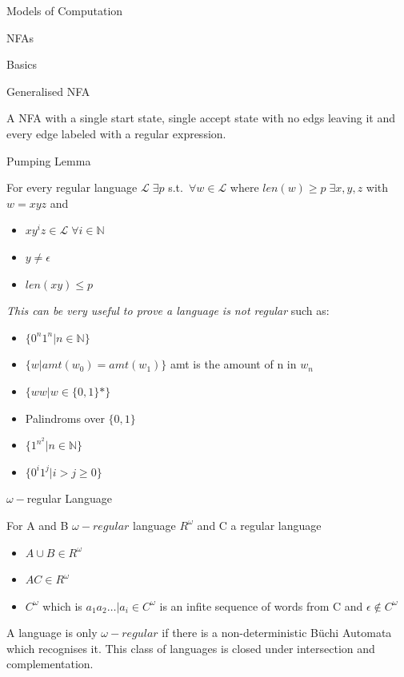 \documentclass[12pt, letterpaper]{article}
\begin{document}
\begin{section}{Models of Computation}
\begin{subsection}{NFAs}
\begin{subsubsection}{Basics}
    \end{subsubsection}

    \begin{subsubsection}{Generalised NFA}

      A NFA with a single start state, single accept state with no edgs leaving
      it and every edge labeled with a regular expression.

    \end{subsubsection}
  
  \end{subsection}

  \begin{subsection}{Pumping Lemma}

    For every regular language \(\mathscr{L} \; \exists p\) s.t.\
    \(\forall w \in \mathscr{L}\) where \(len(w) \geq p \;
    \exists x, y, z\) with \(w = xyz\) and
    \begin{itemize}
      \item \(xy^{i}z \in \mathscr{L} \; \forall i \in \mathbb{N}\)
      \item \(y \neq \epsilon\)
      \item \(len(xy) \leq p\)
    \end{itemize}
    \emph{This can be very useful to prove a language is not regular} such as:
    \begin{itemize}
      \item \(\{ 0^{n}1^{n} | n \in \mathbb{N} \}\)
      \item \(\{ w | amt(w_{0}) = amt(w_{1})\}\) amt is the amount of n in \(w_{n}\)
      \item \(\{ ww | w\in \{ 0, 1 \}* \}\)
      \item Palindroms over \(\{ 0, 1 \}\)
      \item \(\{ 1^{n^{2}} | n \in \mathbb{N} \}\)
      \item \(\{ 0^{i} 1^{j} | i > j \geq 0 \}\)
    \end{itemize}

  \end{subsection}

  \begin{subsection}{\(\omega-\)regular Language}

    For A and B \(\omega-regular\) language \(R^{\omega}\) and C a regular
    language
    \begin{itemize}
      \item \(A \cup B \in R^{\omega}\)
      \item \(AC \in R^{\omega}\)
      \item \(C^{\omega}\) which is \(a_{1}a_{2} \dots | a_{i} \in C^{\omega}\)
      is an infite sequence of words from C and \(\epsilon \notin C^{\omega}\)
    \end{itemize}
    A language is only \(\omega-regular\) if there is a non-deterministic
    B\"uchi Automata which recognises it. This class of languages is closed
    under intersection and complementation.


\end{subsection}
\end{section}
\end{document}
